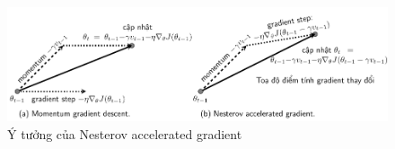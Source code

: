 \begin{figure}[t]
\centering
    \includegraphics[width = \textwidth]{Chapters/04_GradientDescent/GD/latex/NAG.pdf}
    \caption[]{Ý tưởng của Nesterov accelerated gradient}
    \label{fig:8_mynag}
\end{figure}

 

 

